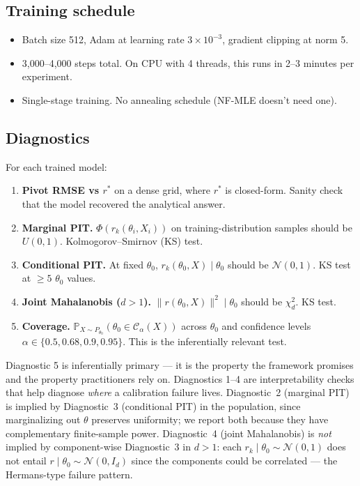 \documentclass[11pt]{article}
\providecommand{\tightlist}{\setlength{\itemsep}{0pt}\setlength{\parskip}{0pt}}
\begin{document}
\subsection{Training schedule}\label{subsec:7.2}

\begin{itemize}
\tightlist
\item
  Batch size 512, Adam at learning rate \(3 \times 10^{-3}\), gradient
  clipping at norm 5.
\item
  3,000--4,000 steps total. On CPU with 4 threads, this runs in 2--3
  minutes per experiment.
\item
  Single-stage training. No annealing schedule (NF-MLE doesn't need
  one).
\end{itemize}

\subsection{Diagnostics}\label{subsec:7.3}

For each trained model:

\begin{enumerate}
\def\labelenumi{\arabic{enumi}.}
\tightlist
\item
  \textbf{Pivot RMSE vs \(r^*\)} on a dense grid, where \(r^*\) is
  closed-form. Sanity check that the model recovered the analytical
  answer.
\item
  \textbf{Marginal PIT.} \(\Phi(r_k(\theta_i, X_i))\) on
  training-distribution samples should be \(U(0,1)\).
  Kolmogorov--Smirnov (KS) test.
\item
  \textbf{Conditional PIT.} At fixed \(\theta_0\),
  \(r_k(\theta_0, X) \mid \theta_0\) should be \(\mathcal{N}(0,1)\). KS
  test at \(\geq 5\) \(\theta_0\) values.
\item
  \textbf{Joint Mahalanobis (\(d > 1\)).}
  \(\|r(\theta_0, X)\|^2 \mid \theta_0\) should be \(\chi^2_d\). KS
  test.
\item
  \textbf{Coverage.}
  \(\mathbb{P}_{X \sim P_{\theta_0}}(\theta_0 \in \mathcal{C}_\alpha(X))\)
  across \(\theta_0\) and confidence levels
  \(\alpha \in \{0.5, 0.68, 0.9, 0.95\}\). This is the inferentially
  relevant test.
\end{enumerate}

Diagnostic 5 is inferentially primary --- it is the property the
framework promises and the property practitioners rely on. Diagnostics
1--4 are interpretability checks that help diagnose \emph{where} a
calibration failure lives. Diagnostic~2 (marginal PIT) is implied by
Diagnostic~3 (conditional PIT) in the population, since marginalizing
out \(\theta\) preserves uniformity; we report both because they have
complementary finite-sample power. Diagnostic~4 (joint Mahalanobis) is
\emph{not} implied by component-wise Diagnostic~3 in \(d > 1\): each
\(r_k \mid \theta_0 \sim \mathcal{N}(0,1)\) does not entail
\(r \mid \theta_0 \sim \mathcal{N}(0, I_d)\) since the components could
be correlated --- the Hermans-type failure pattern.
\end{document}
